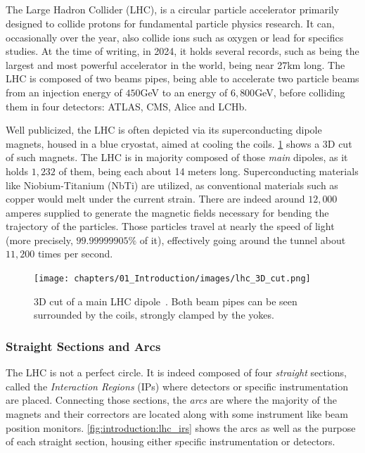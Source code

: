 \subsection{}

The Large Hadron Collider (LHC), is a circular particle accelerator primarily designed to collide
protons for fundamental particle physics research. It can, occasionally over the year, also collide
ions such as oxygen or lead for specifics studies. At the time of writing, in 2024, it holds several
records, such as being the largest and most powerful accelerator in the world, being near 27km long.
The LHC is composed of two beams pipes, being able to accelerate two particle beams from an
injection energy of $450$GeV to an energy of $6,800$GeV, before colliding them in four detectors:
ATLAS, CMS, Alice and LCHb.

Well publicized, the LHC is often depicted via its superconducting dipole magnets, housed in a blue
cryostat, aimed at cooling the coils. \cref{fig:3d_cut_dipole} shows a 3D cut of such magnets. The
LHC is in majority composed of those \textit{main} dipoles, as it holds $1,232$ of them, being each
about 14 meters long. Superconducting materials like Niobium-Titanium (NbTi) are utilized, as
conventional materials such as copper would melt under the current strain. There are indeed around
$12,000$ amperes supplied to generate the magnetic fields necessary for bending the trajectory of
the particles.
Those particles travel at nearly the speed of light (more precisely, $99.99999905\%$ of it),
effectively going around the tunnel about $11,200$ times per second.

\begin{figure}[!htb]
    \centering
    \texttt{[image: chapters/01\_Introduction/images/lhc\_3D\_cut.png]}
    \caption{3D cut of a main LHC dipole~\cite{noauthor_cern_nodate}. Both beam pipes can be seen
    surrounded by the coils, strongly clamped by the yokes.}
    \label{fig:3d_cut_dipole}
\end{figure}


\subsubsection{Straight Sections and Arcs}

The LHC is not a perfect circle. It is indeed composed of four \textit{straight} sections, called
the \textit{Interaction Regions} (IPs) where detectors or specific instrumentation are placed. Connecting
those sections, the \textit{arcs} are where the majority of the magnets and their correctors are
located along with some instrument like beam position monitors.
\cref{fig:introduction:lhc_irs} shows the arcs as well as the purpose of each straight section,
housing either specific instrumentation or detectors.

